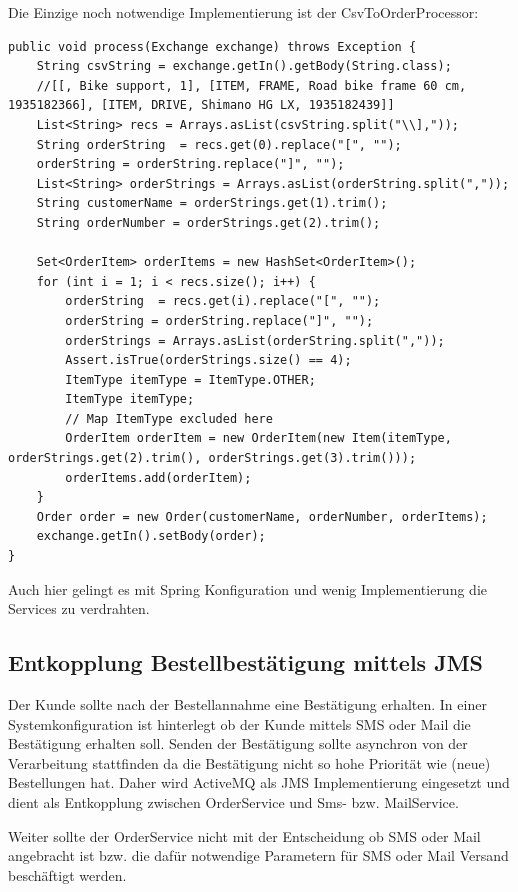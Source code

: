 \documentclass[12pt,a4paper,ngerman]{article}
\begin{document}
Die Einzige noch notwendige Implementierung ist der CsvToOrderProcessor:

\begin{lstlisting}
public void process(Exchange exchange) throws Exception {
    String csvString = exchange.getIn().getBody(String.class);
    //[[, Bike support, 1], [ITEM, FRAME, Road bike frame 60 cm, 1935182366], [ITEM, DRIVE, Shimano HG LX, 1935182439]]
    List<String> recs = Arrays.asList(csvString.split("\\],"));
    String orderString  = recs.get(0).replace("[", "");
    orderString = orderString.replace("]", "");
    List<String> orderStrings = Arrays.asList(orderString.split(","));
    String customerName = orderStrings.get(1).trim();
    String orderNumber = orderStrings.get(2).trim();

    Set<OrderItem> orderItems = new HashSet<OrderItem>();
    for (int i = 1; i < recs.size(); i++) {
        orderString  = recs.get(i).replace("[", "");
        orderString = orderString.replace("]", "");
        orderStrings = Arrays.asList(orderString.split(","));
        Assert.isTrue(orderStrings.size() == 4);
        ItemType itemType = ItemType.OTHER;
        ItemType itemType;
        // Map ItemType excluded here
        OrderItem orderItem = new OrderItem(new Item(itemType, orderStrings.get(2).trim(), orderStrings.get(3).trim()));
        orderItems.add(orderItem);
    }
    Order order = new Order(customerName, orderNumber, orderItems);
    exchange.getIn().setBody(order);
}
\end{lstlisting}

Auch hier gelingt es mit Spring Konfiguration und wenig Implementierung
die Services zu verdrahten.

\subsection{Entkopplung Bestellbestätigung mittels JMS}

Der Kunde sollte nach der Bestellannahme eine Bestätigung erhalten. In
einer Systemkonfiguration ist hinterlegt ob der Kunde mittels SMS oder
Mail die Bestätigung erhalten soll. Senden der Bestätigung sollte
asynchron von der Verarbeitung stattfinden da die Bestätigung nicht so
hohe Priorität wie (neue) Bestellungen hat. Daher wird ActiveMQ als JMS
Implementierung eingesetzt und dient als Entkopplung zwischen
OrderService und Sms- bzw. MailService.

Weiter sollte der OrderService nicht mit der Entscheidung ob SMS oder
Mail angebracht ist bzw. die dafür notwendige Parametern für SMS oder
Mail Versand beschäftigt werden.
\end{document}
